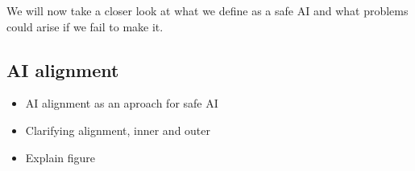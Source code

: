 \documentclass[12pt,A4]{report}
\theoremstyle{definition}
\begin{document}

We will now take a closer look at what we define as a safe AI and what problems could arise if we fail to make it.

\subsection{AI alignment}
\begin{itemize}
  \item AI alignment as an aproach for safe AI
  \item Clarifying alignment, inner and outer
  \item Explain figure
\end{itemize}



\begin{figure}[H]
  
  \caption{}
  \label{fig:alignment}
\end{figure}

\end{document}
